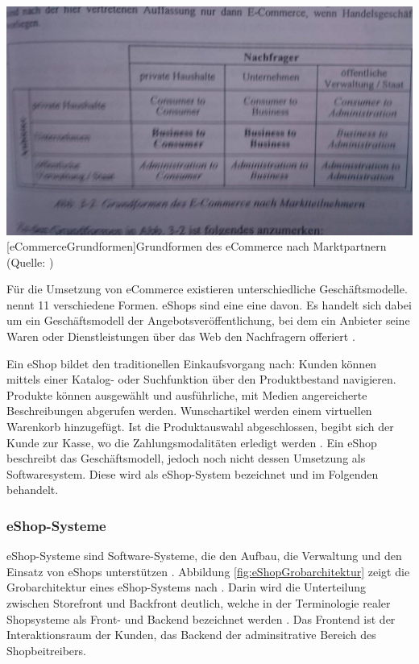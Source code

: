\documentclass[12pt,a4paper,bibliography=totocnumbered,listof=totoc]{scrartcl}
\begin{document}
\vspace{1em}
\begin{minipage}{\linewidth}
	\centering
	\includegraphics[width=0.7\linewidth]{Abbildungen/eCommerceGrundformen.jpg}
	[eCommerceGrundformen]{Grundformen des eCommerce nach Marktpartnern (Quelle: \citet{schwarze02})}
	\label{fig:eCommerceGrundformen}
\end{minipage}
\vspace{1em}

Für die Umsetzung von eCommerce existieren unterschiedliche Geschäftsmodelle. \citet{timmers98} nennt 11 verschiedene Formen. eShops sind eine eine davon. Es handelt sich dabei um ein \glqq Geschäftsmodell der Angebotsveröffentlichung, bei dem ein Anbieter seine Waren oder Dienstleistungen über das Web den Nachfragern offeriert\grqq{} \citep{bartelt00}.

Ein eShop bildet den traditionellen Einkaufsvorgang nach: Kunden können mittels einer Katalog- oder Suchfunktion über den Produktbestand navigieren. Produkte können ausgewählt und ausführliche, mit Medien angereicherte Beschreibungen abgerufen werden. Wunschartikel werden einem virtuellen Warenkorb hinzugefügt. Ist die Produktauswahl abgeschlossen, begibt sich der Kunde zur \glqq Kasse\grqq{}, wo die Zahlungsmodalitäten erledigt werden \citep{boles00}. Ein eShop beschreibt das Geschäftsmodell, jedoch noch nicht dessen Umsetzung als Softwaresystem. Diese wird als eShop-System bezeichnet \citep{boles00} und im Folgenden behandelt.

\subsubsection{eShop-Systeme}
\glqq eShop-Systeme sind Software-Systeme, die den Aufbau, die Verwaltung und den Einsatz von eShops unterstützen\grqq{} \citep{boles00}. Abbildung \ref{fig:eShopGrobarchitektur} zeigt die Grobarchitektur eines eShop-Systems nach \citeauthor{meier12}. Darin wird die Unterteilung zwischen Storefront und Backfront deutlich, welche in der Terminologie realer Shopsysteme als Front- und Backend bezeichnet werden \citep[vgl.][]{shopwareDoku}. Das Frontend ist der Interaktionsraum der Kunden, das Backend der adminsitrative Bereich des Shopbeitreibers.
\end{document}
